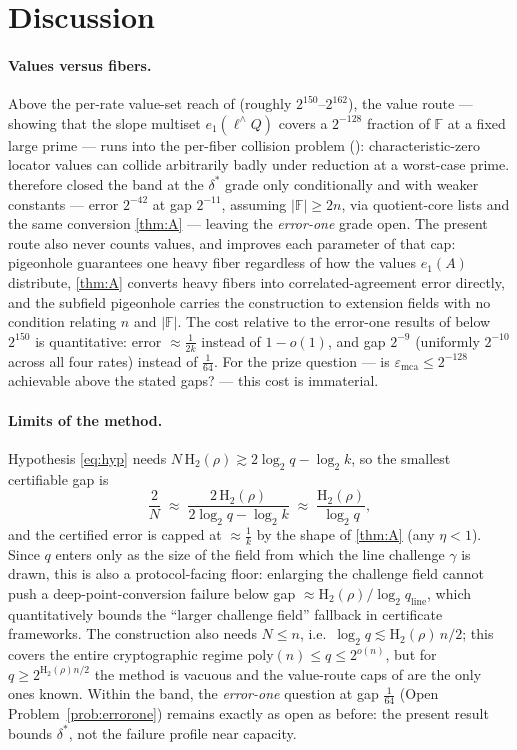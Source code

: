 \documentclass[11pt]{article}
\theoremstyle{definition}
\theoremstyle{remark}
\newcommand{\F}{\mathbb{F}}
\newcommand{\emca}{\varepsilon_{\mathrm{mca}}}
\newcommand{\Hb}{\mathrm{H}_2}
\newcommand{\eone}{e_1}
\begin{document}
\section{Discussion}\label{sec:discussion}

\paragraph{Values versus fibers.}
Above the per-rate value-set reach of \cite{Cho26b} (roughly $2^{150}$--$2^{162}$), the value route --- showing that the slope multiset $\eone(\ell^\wedge Q)$ covers a $2^{-128}$ fraction of $\F$ at a fixed large prime --- runs into the per-fiber collision problem (\cite[Rem.\ ``The remaining band'']{Cho26b}): characteristic-zero locator values can collide arbitrarily badly under reduction at a worst-case prime. \cite{Cho26b} therefore closed the band at the $\delta^*$ grade only conditionally and with weaker constants --- error $2^{-42}$ at gap $2^{-11}$, assuming $|\F|\ge2n$, via quotient-core lists and the same conversion \cref{thm:A} --- leaving the \emph{error-one} grade open. The present route also never counts values, and improves each parameter of that cap: pigeonhole guarantees one heavy fiber regardless of how the values $\eone(A)$ distribute, \cref{thm:A} converts heavy fibers into correlated-agreement error directly, and the subfield pigeonhole carries the construction to extension fields with no condition relating $n$ and $|\F|$. The cost relative to the error-one results of \cite{Cho26a,Cho26b} below $2^{150}$ is quantitative: error $\approx\frac1{2k}$ instead of $1-o(1)$, and gap $2^{-9}$ (uniformly $2^{-10}$ across all four rates) instead of $\frac1{64}$. For the prize question --- is $\emca\le2^{-128}$ achievable above the stated gaps? --- this cost is immaterial.

\paragraph{Limits of the method.}
Hypothesis \eqref{eq:hyp} needs $N\,\Hb(\rho)\gtrsim2\log_2q-\log_2k$, so the smallest certifiable gap is
\[
\frac2N\;\approx\;\frac{2\,\Hb(\rho)}{2\log_2q-\log_2k}\;\approx\;\frac{\Hb(\rho)}{\log_2 q},
\]
and the certified error is capped at $\approx\frac1k$ by the shape of \cref{thm:A} (any $\eta<1$). Since $q$ enters only as the size of the field from which the line challenge $\gamma$ is drawn, this is also a protocol-facing floor: enlarging the challenge field cannot push a deep-point-conversion failure below gap $\approx\Hb(\rho)/\log_2 q_{\mathrm{line}}$, which quantitatively bounds the ``larger challenge field'' fallback in certificate frameworks. The construction also needs $N\le n$, i.e.\ $\log_2q\lesssim\Hb(\rho)\,n/2$; this covers the entire cryptographic regime $\mathrm{poly}(n)\le q\le2^{o(n)}$, but for $q\ge2^{\Hb(\rho)n/2}$ the method is vacuous and the value-route caps of \cite{Cho26a,Cho26b} are the only ones known. Within the band, the \emph{error-one} question at gap $\frac1{64}$ (Open Problem~\ref{prob:errorone}) remains exactly as open as before: the present result bounds $\delta^*$, not the failure profile near capacity.
\end{document}
